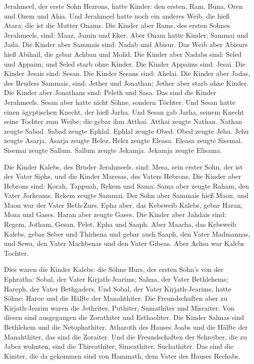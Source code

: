  Jerahmeel, der erste Sohn Hezrons, hatte Kinder: den
ersten, Ram, Buna, Oren und Ozem und Ahia.  Und Jerahmeel
hatte noch ein anderes Weib, die hieß Atara; die ist die Mutter Onams.
 Die Kinder aber Rams, des ersten Sohnes Jerahmeels, sind:
Maaz, Jamin und Eker.  Aber Onam hatte Kinder: Sammai und
Jada. Die Kinder aber Sammais sind: Nadab und Abisur.  Das
Weib aber Abisurs hieß Abihail, die gebar Achban und Molid.
 Die Kinder aber Nadabs sind: Seled und Appaim; und Seled
starb ohne Kinder.  Die Kinder Appaims sind: Jesai. Die
Kinder Jesais sind: Sesan. Die Kinder Sesans sind: Ahelai. 
Die Kinder aber Jadas, des Bruders Sammais, sind: Jether und Jonathan;
Jether aber starb ohne Kinder.  Die Kinder aber Jonathans
sind: Peleth und Sasa. Das sind die Kinder Jerahmeels. 
Sesan aber hatte nicht Söhne, sondern Töchter. Und Sesan hatte einen
ägyptischen Knecht, der hieß Jarha.  Und Sesan gab Jarha,
seinem Knecht seine Tochter zum Weibe; die gebar ihm Atthai.
 Atthai zeugte Nathan. Nathan zeugte Sabad. 
Sabad zeugte Ephlal. Ephlal zeugte Obed.  Obed zeugte Jehu.
Jehu zeugte Asarja.  Asarja zeugte Helez. Helez zeugte
Eleasa.  Eleasa zeugte Sisemai. Sisemai zeugte Sallum.
 Sallum zeugte Jekamja. Jekamja zeugte Elisama.

 Die Kinder Kalebs, des Bruder Jerahmeels, sind: Mesa, sein
erster Sohn, der ist der Vater Siphs, und die Kinder Maresas, des Vaters
Hebrons.  Die Kinder aber Hebrons sind: Korah, Tappuah,
Rekem und Sama.  Sama aber zeugte Raham, den Vater
Jorkeams. Rekem zeugte Sammai.  Der Sohn aber Sammais hieß
Maon, und Maon war der Vater Beth-Zurs.  Epha aber, das
Kebsweib Kalebs, gebar Haran, Moza und Gases. Haran aber zeugte Gases.
 Die Kinder aber Jahdais sind: Regem, Jotham, Gesan, Pelet,
Epha und Saaph.  Aber Maacha, das Kebsweib Kalebs, gebar
Seber und Thirhena  und gebar auch Saaph, den Vater
Madmannas, und Sewa, den Vater Machbenas und den Vater Gibeas. Aber
Achsa war Kalebs Tochter.

 Dies waren die Kinder Kalebs: die Söhne Hurs, des ersten
Sohn's von der Ephratha: Sobal, der Vater Kirjath-Jearims; 
Salma, der Vater Bethlehems; Hareph, der Vater Bethgaders. 
Und Sobal, der Vater Kirjath-Jearims, hatte Söhne: Haroe und die Hälfte
der Manahthiter.  Die Freundschaften aber zu Kirjath-Jearim
waren die Jethriter, Puthiter, Sumathiter und Misraiter. Von diesen sind
ausgegangen die Zorathiter und Esthaoliter.  Die Kinder
Salmas sind Bethlehem und die Netophathiter, Atharoth des Hauses Joabs
und die Hälfte der Manahthiter, das sind die Zoraiter.  Und
die Freundschaften der Schreiber, die zu Jabez wohnten, sind die
Thireathiter, Simeathiter, Suchathiter. Das sind die Kiniter, die da
gekommen sind von Hammath, dem Vater des Hauses Rechabs.


